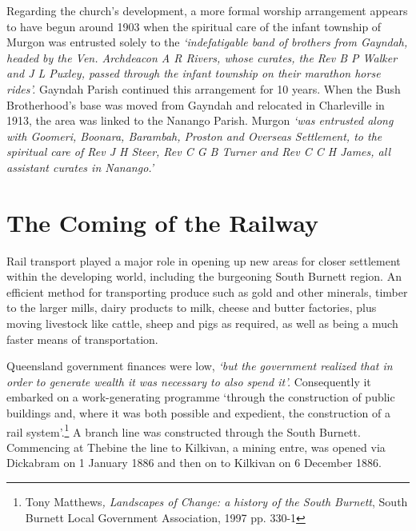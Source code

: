 Regarding the church's development, a more formal worship arrangement appears to have begun around 1903 when the spiritual care of the infant township of Murgon was entrusted solely to the \emph{`indefatigable band of brothers from Gayndah, headed by the Ven. Archdeacon A R Rivers, whose curates, the Rev B P Walker and J L Puxley, passed through the infant township on their marathon horse rides'.} Gayndah Parish continued this arrangement for 10 years. When the Bush Brotherhood's base was moved from Gayndah and relocated in Charleville in 1913, the area was linked to the Nanango Parish. Murgon \emph{`was entrusted along with Goomeri, Boonara, Barambah, Proston and Overseas Settlement, to the spiritual care of Rev J H Steer, Rev C G B Turner and Rev C C H James, all assistant curates in Nanango.'}



\section{The Coming of the Railway}



Rail transport played a major role in opening up new areas for closer settlement within the developing world, including the burgeoning South Burnett region. An efficient method for transporting produce such as gold and other minerals, timber to the larger mills, dairy products to milk, cheese and butter factories, plus moving livestock like cattle, sheep and pigs as required, as well as being a much faster means of transportation.



Queensland government finances were low, \emph{`but the government realized that in order to generate wealth it was necessary to also spend it'.} Consequently it embarked on a work-generating programme `through the construction of public buildings and, where it was both possible and expedient, the construction of a rail system'.\footnote{Tony Matthews\emph{, Landscapes of Change: a history of the South Burnett}, South Burnett Local Government Association, 1997 pp. 330-1} A branch line was constructed through the South Burnett. Commencing at Thebine the line to Kilkivan, a mining entre, was opened via Dickabram on 1 January 1886 and then on to Kilkivan on 6 December 1886.


